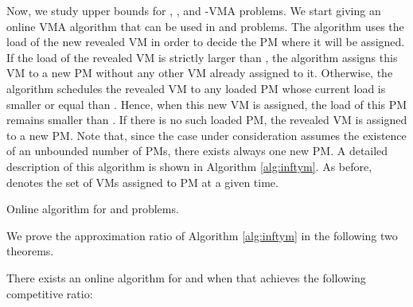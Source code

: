 

Now, we study upper bounds for  \VMA, \CVMA, and -VMA problems. We start giving an online VMA algorithm that can be used in \VMA and \CVMA problems. The algorithm uses the load of the new revealed VM in order to decide the PM
where it will be assigned.
If the load of the revealed VM is strictly larger than , the algorithm assigns this VM to a new PM without any other VM already assigned to it. Otherwise, the algorithm schedules the revealed VM to any loaded PM whose current load is smaller or equal than . Hence, when this new VM is assigned, the load of this PM remains smaller than .
If there is no such loaded PM, the revealed VM is assigned to a new PM.
Note that, since the case under consideration assumes the existence of an unbounded number of PMs, there exists always one new PM. A detailed description of this algorithm is shown in Algorithm \ref{alg:inftym}. As before,  denotes the set of VMs assigned to PM  at a given time.
\begin{algorithm}

\caption{Online algorithm for \VMA and \CVMA problems.}
\label{alg:inftym}
\end{algorithm}

We prove the approximation ratio of Algorithm \ref{alg:inftym} in the following two theorems.
\begin{theorem}
\label{theo:UBunboundedPMs}
There exists an online algorithm for \VMA and \CVMA when  that achieves the following competitive ratio: 

\end{theorem}


